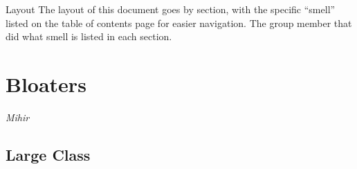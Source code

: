 \documentclass[12pt]{article}
\begin{document}
\maketitlepage

\begin{aside}{Layout}
    The layout of this document goes by section, with the specific ``smell'' listed on 
    the table of contents page for easier navigation. The group member that did what smell 
    is listed in each section.
\end{aside}

\tableofcontents
\newpage

\section{Bloaters}

\textit{Mihir}

\subsection{Large Class}
\end{document}
